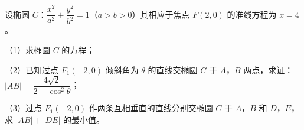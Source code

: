 \begin{question}
设椭圆 $C$：$\dfrac{x^2}{a^2}+\dfrac{y^2}{b^2}=1$（$a>b>0$）其相应于焦点 $F(2,0)$ 的准线方程为 $x=4$。

（1）求椭圆 $C$ 的方程；

（2）已知过点 $F_1(-2,0)$ 倾斜角为 $\theta$ 的直线交椭圆 $C$ 于 $A$，$B$ 两点，求证：$|AB|=\dfrac{4\sqrt2}{2-\cos^2\theta}$；

（3）过点 $F_1(-2,0)$ 作两条互相垂直的直线分别交椭圆 $C$ 于 $A$，$B$ 和 $D$，$E$，求 $|AB|+|DE|$ 的最小值。

\end{question}